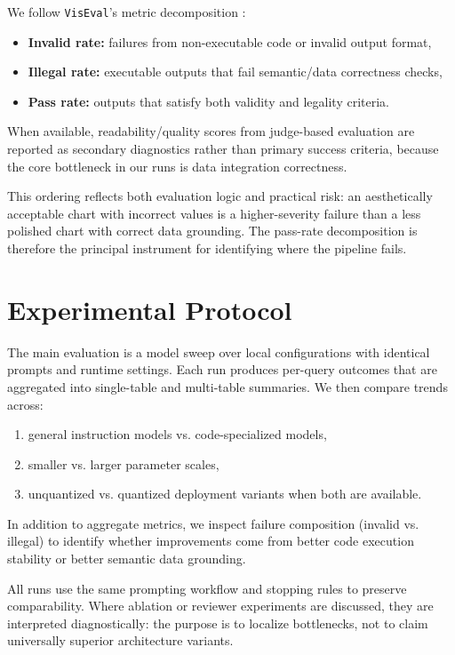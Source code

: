\documentclass[a4paper,oneside,bibliography=totoc]{scrbook}
\begin{document}
We follow \texttt{VisEval}'s metric decomposition \cite{chen2025viseval}:
\begin{itemize}
  \item \textbf{Invalid rate:} failures from non-executable code or invalid output format,
  \item \textbf{Illegal rate:} executable outputs that fail semantic/data correctness checks,
  \item \textbf{Pass rate:} outputs that satisfy both validity and legality criteria.
\end{itemize}

When available, readability/quality scores from judge-based evaluation are reported as secondary diagnostics rather than primary success criteria, because the core bottleneck in our runs is data integration correctness.

This ordering reflects both evaluation logic and practical risk: an aesthetically acceptable chart with incorrect values is a higher-severity failure than a less polished chart with correct data grounding. The pass-rate decomposition is therefore the principal instrument for identifying where the pipeline fails.

\section{Experimental Protocol}

The main evaluation is a model sweep over local configurations with identical prompts and runtime settings. Each run produces per-query outcomes that are aggregated into single-table and multi-table summaries. We then compare trends across:
\begin{enumerate}
  \item general instruction models vs.
code-specialized models,
  \item smaller vs.
larger parameter scales,
  \item unquantized vs.
quantized deployment variants when both are available.
\end{enumerate}

In addition to aggregate metrics, we inspect failure composition (invalid vs.
illegal) to identify whether improvements come from better code execution stability or better semantic data grounding.

All runs use the same prompting workflow and stopping rules to preserve comparability. Where ablation or reviewer experiments are discussed, they are interpreted diagnostically: the purpose is to localize bottlenecks, not to claim universally superior architecture variants.
\end{document}
